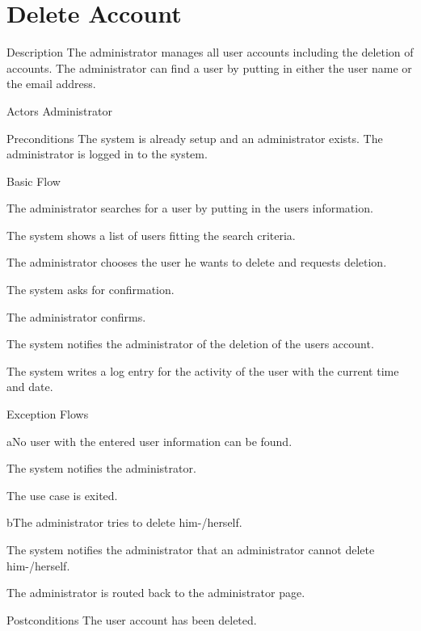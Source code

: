\section{Delete Account}

%
\begin{cpart}{Description}
The administrator manages all user accounts including the deletion of accounts. The administrator can find a user by putting in either the user name or the email address.
\end{cpart}


%
\begin{cpart}{Actors}
Administrator
\end{cpart}

%
\begin{cpart}{Preconditions}
The system is already setup and an administrator exists. The administrator is logged in to the system.
\end{cpart}

%
\begin{cpartList}{Basic Flow}
  \item The administrator searches for a user by putting in the users information.
  \item The system shows a list of users fitting the search criteria.
  \item The administrator chooses the user he wants to delete and requests deletion.
  \item The system asks for confirmation.
  \item The administrator confirms.
  \item The system notifies the administrator of the deletion of the users account.
\item The system writes a log entry for the activity of the user with the current time and date.
\end{cpartList}

%
\begin{cpartList}{Exception Flows}
  \begin{innerList}{4}{a}{No user with the entered user information can be found.}
    \item The system notifies the administrator.
    \item The use case is exited.
  \end{innerList}

  \begin{innerList}{4}{b}{The administrator tries to delete him-/herself.}
    \item The system notifies the administrator that an administrator cannot delete him-/herself.
    \item The administrator is routed back to the administrator page.
  \end{innerList}
\end{cpartList}

%
\begin{cpart}{Postconditions}
The user account has been deleted.
\end{cpart}

\clearpage
